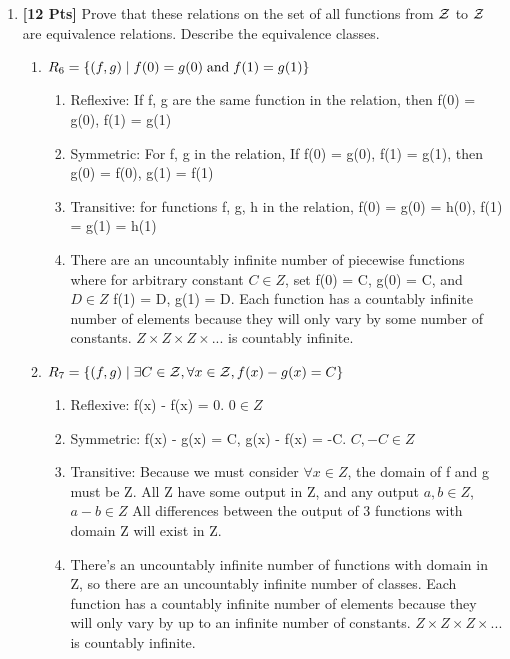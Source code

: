 \begin{enumerate}
        \item {\bf [12 Pts]} Prove that these relations on the set of all functions from $\cal Z$ to $\cal Z$ are equivalence relations. Describe the equivalence classes.

        \begin{enumerate}

            \item $R_6 = \{(f,g) \mid f(0) = g(0) \; {\rm and} \; f(1) = g(1)\}$
                \begin{enumerate}
                    \item Reflexive: If f, g are the same function in the relation, then f(0) = g(0), f(1) = g(1)
                    \item Symmetric: For f, g in the relation, If f(0) = g(0), f(1) = g(1), then g(0) = f(0), g(1) = f(1)
                    \item Transitive: for functions f, g, h in the relation, f(0) = g(0) = h(0), f(1) = g(1) = h(1)
                    \item There are an uncountably infinite number of piecewise functions where for arbitrary constant $C \in Z$, set f(0) = C, g(0) = C, and $D \in Z$ f(1) = D, g(1) = D.  Each function has a countably infinite number of elements because they will only vary by some number of constants. $Z \times Z \times Z \times ...$ is countably infinite.
                \end{enumerate}
            \item $R_7 = \{(f,g) \mid \exists C \in {\cal Z}, \forall x \in {\cal Z}, f(x) - g(x) = C\}$
                \begin{enumerate}
                    \item Reflexive: f(x) - f(x) = 0. $0 \in Z$
                    \item Symmetric: f(x) - g(x) = C, g(x) - f(x) = -C. $C, -C \in Z$
                    \item Transitive: Because we must consider $\forall x \in Z$, the domain of f and g must be Z. All Z have some output in Z, and any output $a, b \in Z$, $a - b \in Z$ All differences between the output of 3 functions with domain Z will exist in Z.
                    \item There's an uncountably infinite number of functions with domain in Z, so there are an uncountably infinite number of classes. Each function has a countably infinite number of elements because they will only vary by up to an infinite number of constants. $Z \times Z \times Z \times ...$ is countably infinite.
                \end{enumerate}
        \end{enumerate}
        \newpage


\end{enumerate}
